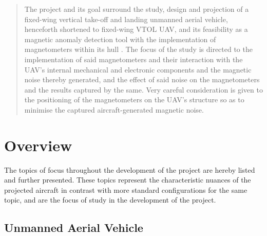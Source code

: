 \documentclass[english,fira]{ist-report}
\begin{document}


\begin{abstract}
    The project and its goal surround the study, design and projection of a fixed-wing vertical take-off and landing unmanned aerial vehicle, henceforth shortened to fixed-wing VTOL UAV, and its feasibility as a magnetic anomaly detection tool with the implementation of magnetometers within its hull \cite{proj_desc}. The focus of the study is directed to the implementation of said magnetometers and their interaction with the UAV's internal mechanical and electronic components and the magnetic noise thereby generated, and the effect of said noise on the magnetometers and the results captured by the same. Very careful consideration is given to the positioning of the magnetometers on the UAV's structure so as to minimise the captured aircraft-generated magnetic noise.
\end{abstract}

{
    \tableofcontents
    \listoffigures
    \listoftables
    \glsaddall
    \printglossary[type=symbols,nogroupskip,nonumberlist]
}

\chapter{Overview}

The topics of focus throughout the development of the project are hereby listed and further presented. These topics represent the characteristic nuances of the projected aircraft in contrast with more standard configurations for the same topic, and are the focus of study in the development of the project.

\section{Unmanned Aerial Vehicle}
\end{document}
